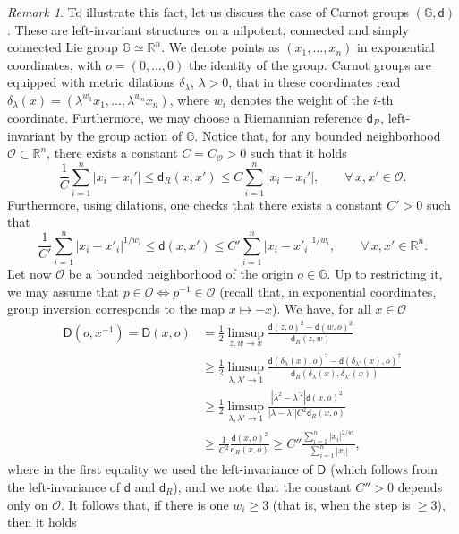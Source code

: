 \documentclass[11pt,a4paper]{article}
\theoremstyle{plain}
\theoremstyle{definition}
\theoremstyle{remark}
\newtheorem{remark}[theorem]{Remark}
\numberwithin{equation}{section}
\newcommand{\R}{\mathbb{R}} %
\newcommand{\sfd}{\mathsf d}
\newcommand{\sfD}{\mathsf D}
\begin{document}
\begin{remark}
To illustrate this fact, let us discuss the case of Carnot groups $(\mathbb{G},\sfd)$. These are left-invariant structures on a nilpotent, connected and simply connected Lie group $\mathbb{G} \simeq \R^n$. We denote points as $(x_1,\dots,x_n)$ in exponential coordinates, with $o=(0,\dots,0)$ the identity of the group. Carnot groups are equipped with metric dilations $\delta_\lambda$, $\lambda>0$, that in these coordinates read $\delta_\lambda(x) = (\lambda^{w_1} x_1,\dots,\lambda^{w_n}x_n)$, where $w_i$ denotes the weight of the $i$-th coordinate. Furthermore, we may choose a Riemannian reference $\sfd_R$, left-invariant by the group action of $\mathbb{G}$. Notice that, for any bounded neighborhood $\mathcal{O}\subset \R^n$, there exists a constant $C=C_{\mathcal{O}}>0$ such that it holds
\begin{equation}
\frac{1}{C} \sum_{i=1}^n|x_i-x_i'|\leq \sfd_R(x,x') \leq C \sum_{i=1}^n|x_i-x_i'|, \qquad \forall\, x,x'\in \mathcal{O}.
\end{equation}
Furthermore, using dilations, one checks that there exists a constant $C'>0$ such that 
\begin{equation}
\frac{1}{C'}\sum_{i=1}^n |x_i-x'_i|^{1/w_i}\leq \sfd(x,x') \leq C'\sum_{i=1}^n |x_i-x'_i|^{1/w_i}, \qquad \forall\, x,x'\in \R^n.
\end{equation}
Let now $\mathcal{O}$ be a bounded neighborhood of the origin $o\in \mathbb{G}$. Up to restricting it, we may assume that $p\in \mathcal{O} \Leftrightarrow p^{-1}\in \mathcal{O}$ (recall that, in exponential coordinates, group inversion corresponds to the map $x\mapsto -x$). We have, for all $x\in \mathcal{O}$
\begin{align}
\sfD(o,x^{-1})=\sfD(x,o) & = \frac{1}{2}\limsup_{z,w\to x} \frac{\sfd(z,o)^2-\sfd(w,o)^2}{\sfd_R(z,w)} \\
& \geq \frac{1}{2}\limsup_{\lambda,\lambda'\to 1} \frac{\sfd(\delta_\lambda(x),o)^2-\sfd(\delta_{\lambda'}(x),o)^2}{\sfd_R(\delta_\lambda(x),\delta_{\lambda'}(x))} \\
& \geq \frac{1}{2} \limsup_{\lambda,\lambda'\to 1} \frac{|\lambda^2-\lambda^{'2}|\sfd(x,o)^2}{|\lambda - \lambda'|C^2 \sfd_R(x,o)}\\
& \geq \frac{1}{C^2} \frac{\sfd(x,o)^2}{\sfd_R(x,o)} \geq C'' \frac{\sum_{i=1}^n |x_i|^{2/w_i}}{\sum_{i=1}^n |x_i|},\label{eq:finalestimate-unbound}
\end{align}
where in the first equality we used the left-invariance of $\sfD$ (which follows from the left-invariance of $\sfd$ and $\sfd_R$), and we note that the constant $C''>0$ depends only on $\mathcal{O}$. It follows that, if there is one $w_i\geq 3$ (that is, when the step is $\geq 3$), then it holds

\end{remark}
\end{document}
